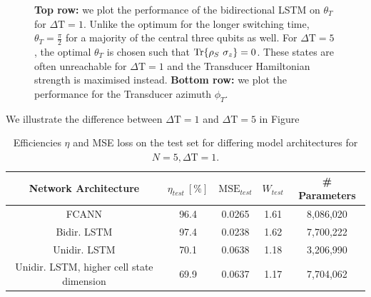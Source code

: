 \begin{figure}
\begin{subfigure}{0.32\textwidth}
	\end{subfigure}
	\caption{\textbf{Top row:} we plot the performance of the bidirectional LSTM on $\theta_T$ for $\Delta \mathrm{T} = 1$. Unlike the optimum for the longer switching time, $\theta_T = \frac{\pi}{2}$ for a majority of the central three qubits as well. For $\Delta \mathrm{T} = 5$, the optimal $\theta_T$ is chosen such that $\Tr{\rho_S \ \sigma_z} = 0$. These states are often unreachable for $\Delta \mathrm{T} = 1$ and the Transducer Hamiltonian strength is maximised instead.  \textbf{Bottom row:} we plot the performance for the Transducer azimuth $\phi_T$.}
	\label{dt1box}
\end{figure}

We illustrate the difference between $\Delta \mathrm{T} = 1$ and $\Delta \mathrm{T} = 5$ in Figure

\begin{table}[h]
	\centering
	\begin{tabular}{ c | c | c | c | c }
		Network Architecture & $\eta_{test} \ [\%]$ & $\mathrm{MSE}_{test}$  & $W_{test}$ & \# Parameters \\
		\hline
		FCANN        & 96.4 & 0.0265 & 1.61 & 8,086,020 \\
		Bidir. LSTM  & 97.4 & 0.0238 & 1.62 & 7,700,222 \\
		Unidir. LSTM & 70.1 & 0.0638 & 1.18 & 3,206,990 \\
		Unidir. LSTM, higher cell state dimension & 69.9 & 0.0637 & 1.17 & 7,704,062 \\
	\end{tabular}
	\caption{Efficiencies $\eta$ and MSE loss on the test set for differing model architectures for $N=5, \Delta \mathrm{T} = 1$.}
	\label{effdt1}
\end{table}


